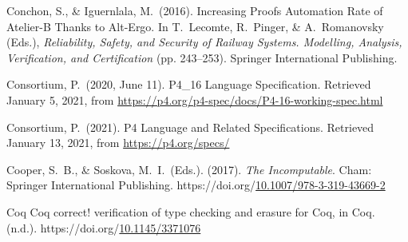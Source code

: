 \documentclass[12pt,twoside]{article}
\begin{document}
{\begin{thebibliography}{1079}
\mdbibitemlabel{}Conchon, S., \& Iguernlala, M.~(2016). Increasing Proofs Automation Rate of Atelier-B Thanks to Alt-Ergo. In T.~Lecomte, R.~Pinger, \& A.~Romanovsky (Eds.), \emph{Reliability, Safety, and Security of Railway Systems. Modelling, Analysis, Verification, and Certification} (pp. 243–253). Springer International Publishing.%

\mdbibitemlabel{}Consortium, P.~(2020, June 11). P4\_16 Language Specification. Retrieved January 5, 2021, from \href{https://p4.org/p4-spec/docs/P4-16-working-spec.html}{{\ttfamily https://\hspace{0pt}p4.\hspace{0pt}org/\hspace{0pt}p4-\hspace{0pt}spec/\hspace{0pt}docs/\hspace{0pt}P4-\hspace{0pt}16-\hspace{0pt}working-\hspace{0pt}spec.\hspace{0pt}html}}%

\mdbibitemlabel{}Consortium, P.~(2021). P4 Language and Related Specifications. Retrieved January 13, 2021, from \href{https://p4.org/specs/}{{\ttfamily https://\hspace{0pt}p4.\hspace{0pt}org/\hspace{0pt}specs/\hspace{0pt}}}%

\mdbibitemlabel{}Cooper, S.~B., \& Soskova, M.~I.~(Eds.). (2017). \emph{The Incomputable}. Cham: Springer International Publishing. https://doi.org/\href{https://dx.doi.org/10.1007/978-3-319-43669-2}{10.1007/978-3-319-43669-2}%

\mdbibitemlabel{}Coq Coq correct! verification of type checking and erasure for Coq, in Coq. (n.d.). https://doi.org/\href{https://dx.doi.org/10.1145/3371076}{10.1145/3371076}%


\end{thebibliography}}
\end{document}
